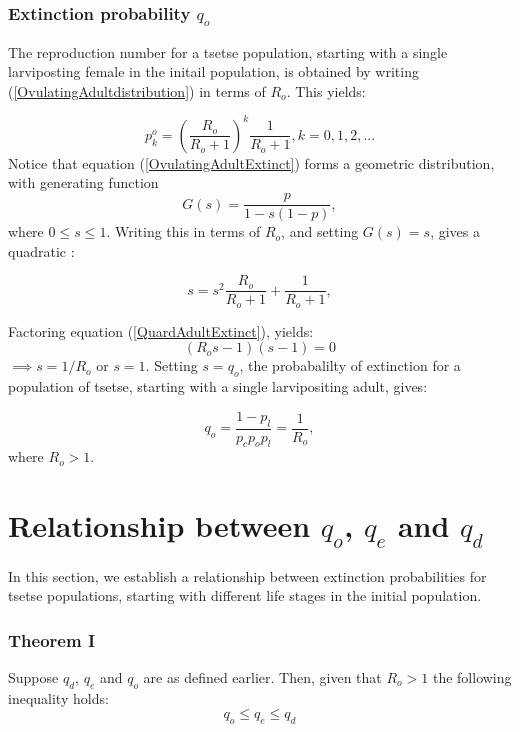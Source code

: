\subsubsection{Extinction probability  $q_{o}$}

The reproduction number for a tsetse population, starting with a single larviposting female in the initail population, is obtained by writing  (\ref{OvulatingAdultdistribution}) in terms of  $R_{o}$. This yields:

\begin{equation}
\label{OvulatingAdultExtinct}
p_{k}^{o} = (\frac{R_{o}}{R_{o} + 1})^k\frac{1}{R_{o} + 1}, k =0,1,2,...
\end{equation}
Notice that equation (\ref{OvulatingAdultExtinct}) forms a geometric distribution, with generating function  $$G(s) = \frac{p}{1-s(1-p)}, $$ where $0\leq s \leq 1$. Writing this in terms of $R_o$, and setting $G(s)=s$, gives a quadratic :

\begin{equation}
\label{QuardAdultExtinct}
s =s^2\frac{R_{o}}{R_{o} + 1} + \frac{1}{R_{o} + 1} ,
\end{equation} 

Factoring equation (\ref{QuardAdultExtinct}), yields:
 $$(R_os-1)(s-1) = 0$$ $\implies s=1/R_o$ or $s=1$. Setting $s=q_o$,  the probabalilty of extinction for a population of tsetse, starting with a single larvipositing adult, gives: 


\begin{equation}
\label{extinctionYoungadult}
q_{o} = \frac{1-p_{l}}{p_{c}p_{o}p_{l}} = \frac{1}{R_{o}},
\end{equation}
where $R_o > 1$.

\section{Relationship between $q_{o}$, $q_{e}$ and $q_{d}$}

In this section, we establish a relationship between extinction probabilities for tsetse populations, starting with different life stages in the initial population. 

\subsubsection*{Theorem I}
Suppose $q_{d}$, $q_{e}$ and $q_{o}$ are as defined earlier. Then,  given that $R_{o}>1$ the following inequality holds:
\begin{equation}
\label{Aretsetsetheorem}
q_{o}\leq q_{e} \leq q_{d}
\end{equation}


